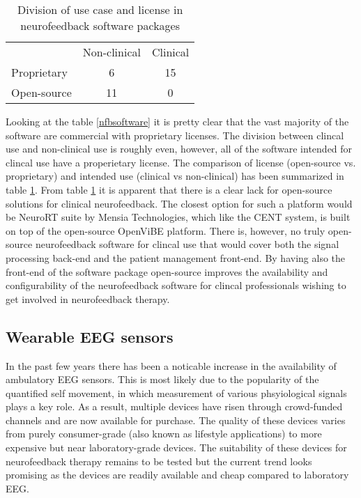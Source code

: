 \begin{table}[h]
\centering
\begin{tabular}{lcc}
& Non-clinical  & Clinical \\       
Proprietary & 6 & 15 \\
Open-source  & 11 & 0 \\
\end{tabular}
    \caption{Division of use case and license in neurofeedback software packages}\label{nfbsummary}
\end{table}

Looking at the table \ref{nfbsoftware} it is pretty clear that the vast majority of the software are commercial with  proprietary licenses. The division between clincal use and non-clinical use is roughly even, however, all of the software intended for clincal use have a properietary license. The comparison of license (open-source vs. proprietary) and intended use (clinical vs non-clinical) has been summarized in table \ref{nfbsummary}. From table \ref{nfbsummary} it is apparent that there is a clear lack for open-source solutions for clinical neurofeedback. The closest option for such a platform would be NeuroRT suite by Mensia Technologies, which like the CENT system, is built on top of the open-source OpenViBE platform. There is, however, no truly open-source neurofeedback software for clincal use that would cover both the signal processing back-end and the patient management front-end. By having also the front-end of the software package open-source improves the availability and configurability of the neurofeedback software for clincal professionals wishing to get involved in neurofeedback therapy.


\subsection{Wearable EEG sensors} %
In the past few years there has been a noticable increase in the availability of ambulatory EEG sensors. This is most likely due to the popularity of the quantified self movement, in which measurement of various phsyiological signals plays a key role. As a result, multiple devices have risen through crowd-funded channels and are now available for purchase. The quality of these devices varies from purely consumer-grade (also known as lifestyle applications) to more expensive but near laboratory-grade devices. The suitability of these devices for neurofeedback therapy remains to be tested but the current trend looks promising as the devices are readily available and cheap compared to laboratory EEG. 

